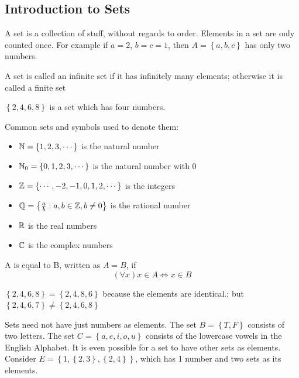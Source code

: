 \subsection{Introduction to Sets}
\begin{definition}
    [Set] A set is a collection of stuff, without regards to order. Elements in a set are only counted once. 
    For example if $a = 2$, $b = c = 1$, then $A = \left\{a, b, c\right\}$ has only two numbers. 

    A set is called an infinite set if it has infinitely many elements; otherwise it is called a finite set
\end{definition}
\begin{example}
    $\left \{2, 4, 6, 8\right \}$ is a set which has four numbers. 
\end{example}

\begin{example}
    Common sets and symbols used to denote them:
    \begin{itemize}
        \item $\mathbb{N} = \left\{1, 2, 3, \cdots\right\}$ is the natural number
        \item $\mathbb{N}_0 = \left\{0, 1, 2, 3, \cdots\right\}$ is the natural number with 0
        \item $\mathbb{Z} = \left\{\cdots, -2, -1, 0, 1, 2, \cdots\right\}$ is the integers
        \item $\mathbb{Q} = \left\{\tfrac{a}{b} : a, b \in \mathbb{Z}, b \neq 0\right\}$ is the rational number
        \item $\mathbb{R}$ is the real numbers 
        \item $\mathbb{C}$ is the complex numbers
    \end{itemize}
\end{example}

\begin{definition}
     A is equal to B, written as $A = B$, if 
    $$(\forall x)x \in A \iff x \in B$$
\end{definition}

\begin{example}
    $\left\{2, 4, 6, 8\right\} = \left\{2, 4, 8, 6\right\}$ because the elements are identical.; 
    but $\left\{2, 4, 6, 7\right\} \neq \left\{2, 4, 6, 8\right\}$
\end{example}

Sets need not have just numbers as elements. 
The set $B = \left\{T, F\right\}$ consists of two letters.
The set $C = \left\{a, e, i, o, u\right\}$ consists of the lowercase vowels in the English Alphabet. 
It is even possible for a set to have other sets as elements. 
Consider $E = \left\{1, \left\{2, 3\right\}, \left\{2, 4\right\}\right\}$, which has 1 number and two sets as its elements.

